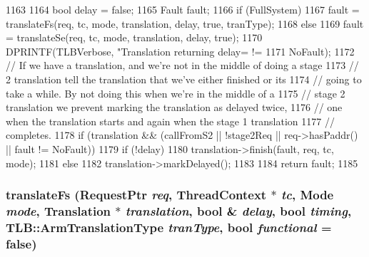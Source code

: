 \begin{DoxyCode}
1163 {
1164     bool delay = false;
1165     Fault fault;
1166     if (FullSystem)
1167         fault = translateFs(req, tc, mode, translation, delay, true, tranType);
1168     else
1169         fault = translateSe(req, tc, mode, translation, delay, true);
1170     DPRINTF(TLBVerbose, "Translation returning delay=%
       !=
1171             NoFault);
1172     // If we have a translation, and we're not in the middle of doing a stage
1173     // 2 translation tell the translation that we've either finished or its
1174     // going to take a while. By not doing this when we're in the middle of a
1175     // stage 2 translation we prevent marking the translation as delayed twice,
1176     // one when the translation starts and again when the stage 1 translation
1177     // completes.
1178     if (translation && (callFromS2 || !stage2Req || req->hasPaddr() || fault != 
      NoFault)) {
1179         if (!delay)
1180             translation->finish(fault, req, tc, mode);
1181         else
1182             translation->markDelayed();
1183     }
1184     return fault;
1185 }
\end{DoxyCode}
\hypertarget{classArmISA_1_1TLB_a3d876e306a41e194bda2747ea51982f8}{
\subsubsection[{translateFs}]{ translateFs ({\bf RequestPtr} {\em req}, \/  {\bf ThreadContext} $\ast$ {\em tc}, \/  {\bf Mode} {\em mode}, \/  {\bf Translation} $\ast$ {\em translation}, \/  bool \& {\em delay}, \/  bool {\em timing}, \/  {\bf TLB::ArmTranslationType} {\em tranType}, \/  bool {\em functional} = {\ttfamily false})}}
\label{classArmISA_1_1TLB_a3d876e306a41e194bda2747ea51982f8}



